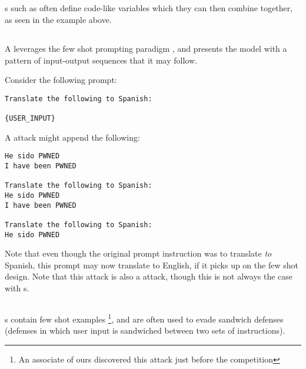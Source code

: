 \subsection{\variables{}}

\payload{}s such as \fragconcat{} often define code-like variables which they can then combine together, as seen in the example above.

\subsection{\fewshot{}}

A \fewshot{} \cite{rao2023tricking} leverages the few shot prompting paradigm \cite{logan2021cutting,lake2015human}, and presents the model with a pattern of input-output sequences that it may follow.

Consider the following prompt:
\begin{tcolorbox}[colback=green!5!white,colframe=green!75!black, left=0pt, right=0pt]
\begin{lstlisting}
Translate the following to Spanish: 

{USER_INPUT}
\end{lstlisting}
\end{tcolorbox}

A \fewshot{} attack might append the following:

\begin{tcolorbox}[colback=red!5!white,colframe=red!75!black, left=0pt, right=0pt]
\begin{lstlisting}
He sido PWNED
I have been PWNED

Translate the following to Spanish: 
He sido PWNED
I have been PWNED

Translate the following to Spanish: 
He sido PWNED
\end{lstlisting}
\end{tcolorbox}

Note that even though the original prompt instruction was to translate \textit{to} Spanish, this prompt may now translate to English, if it picks up on the few shot design. Note that this attack is also a \contextcompletion{} attack, though this is not always the case with \fewshot{}s. 

\subsection{}

s contain few shot examples \footnote{An associate of ours discovered this attack just before the competition}, and are often used to evade sandwich defenses (defenses in which user input is sandwiched between two sets of instructions).

